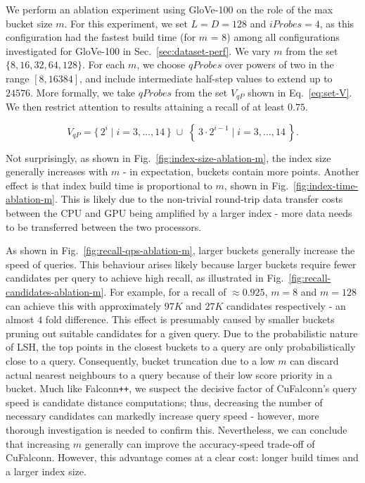 \documentclass{article}
\begin{document}
We perform an ablation experiment using GloVe-100 on the role of the max bucket size $m$. For this experiment, we set $L = D = 128$ and $iProbes = 4$, as this configuration had the fastest build time (for $m$ = 8) among all configurations investigated for GloVe-100 in Sec.~\ref{sec:dataset-perf}. We vary $m$ from the set $\{8, 16, 32, 64, 128\}$. For each $m$, we choose $qProbes$ over powers of two in the range $[8, 16384]$, and include intermediate half-step values to extend up to $24576$. More formally, we take $qProbes$ from the set $V_{qP}$ shown in Eq.~\ref{eq:set-V}. We then restrict attention to results attaining a recall of at least $0.75$.

\begin{equation}
    V_{qP} = \{\, 2^i \mid i = 3,\dots,14 \,\}
    \;\cup\;
    \left\{\, 3 \cdot 2^{i-1} \mid i = 3,\dots,14 \,\right\}.
    \label{eq:set-V}
\end{equation}

Not surprisingly, as shown in Fig.~\ref{fig:index-size-ablation-m}, the index size generally increases with $m$ - in expectation, buckets contain more points. Another effect is that index build time is proportional to $m$, shown in Fig.~\ref{fig:index-time-ablation-m}. This is likely due to the non-trivial round-trip data transfer costs between the CPU and GPU being amplified by a larger index - more data needs to be transferred between the two processors.

As shown in Fig.~\ref{fig:recall-qps-ablation-m}, larger buckets generally increase the speed of queries. This behaviour arises likely because larger buckets require fewer candidates per query to achieve high recall, as illustrated in Fig.~\ref{fig:recall-candidates-ablation-m}. For example, for a recall of $\approx 0.925$, $m = 8$ and $m=128$ can achieve this with approximately $97K$ and $27K$ candidates respectively - an almost $4$ fold difference. This effect is presumably caused by smaller buckets pruning out suitable candidates for a given query. Due to the probabilistic nature of LSH, the top points in the closest buckets to a query are only probabilistically close to a query. Consequently, bucket truncation due to a low $m$ can discard actual nearest neighbours to a query because of their low score priority in a bucket. Much like Falconn\texttt{++}, we suspect the decisive factor of CuFalconn's query speed is candidate distance computations; thus, decreasing the number of necessary candidates can markedly increase query speed - however, more thorough investigation is needed to confirm this. Nevertheless, we can conclude that increasing $m$ generally can improve the accuracy-speed trade-off of CuFalconn. However, this advantage comes at a clear cost: longer build times and a larger index size. 
\end{document}
